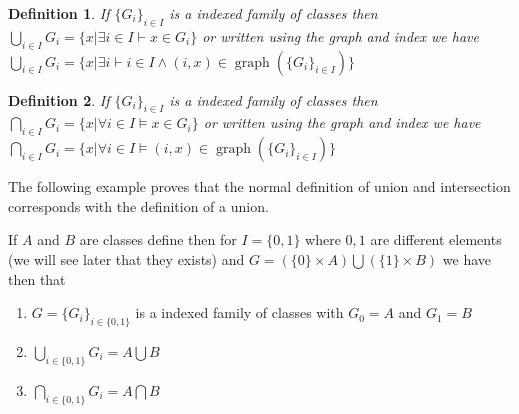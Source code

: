 \documentclass{book}
\newcommand{\nobracket}{}
\newcommand{\tmop}[1]{\ensuremath{\operatorname{#1}}}
\newtheorem{definition}{Definition}
{\theorembodyfont{\rmfamily}\newtheorem{example}{Example}}
\begin{document}
{{\begin{definition}
  If $\{ G_i \}_{i \in I}$ is a indexed family of classes then $\bigcup_{i \in
  I} G_i = \{ x | \exists i \in I \vdash x \in G_i \nobracket \}$ or written
  using the graph and index we have $\bigcup_{i \in I} G_i = \{ x | \exists i
  \nobracket \vdash i \in I \wedge (i, x) \in \tmop{graph} (\{ G_i \}_{i \in
  I}) \}$
\end{definition}

\begin{definition}
  If $\{ G_i \}_{i \in I}$ is a indexed family of classes then $\bigcap_{i \in
  I} G_i = \{ x | \forall i \in I \vDash x \in G_i \nobracket \}$ or written
  using the graph and index we have $\bigcap_{i \in I} G_i = \{ x | \forall i
  \in I \nobracket \vDash (i, x) \in \tmop{graph} (\{ G_i \}_{i \in I}) \}$
\end{definition}

The following example proves that the normal definition of union and
intersection corresponds with the definition of a union.

\begin{example}
  If $A$ and $B$ are classes define then for $I = \{ 0, 1 \}$ where $0, 1$ are
  different elements (we will see later that they exists) and $G = (\{ 0 \}
  \times A) \bigcup (\{ 1 \} \times B)$ we have then that
  \begin{enumerate}
    \item $G = \{ G_i \}_{i \in \{ 0, 1 \}}$ is a indexed family of classes
    with $G_0 = A$ and $G_1 = B$
    
    \item $\bigcup_{i \in \{ 0, 1 \}} G_i = A \bigcup B_{}$
    
    \item $\bigcap_{i \in \{ 0, 1 \}} G_i = A \bigcap B$
  \end{enumerate}
\end{example}

}}
\end{document}
